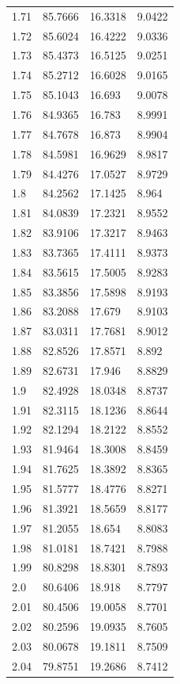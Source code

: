 \begin{tabular}{llll}
1.71 & 85.7666 & 16.3318 & 9.0422 \\
1.72 & 85.6024 & 16.4222 & 9.0336 \\
1.73 & 85.4373 & 16.5125 & 9.0251 \\
1.74 & 85.2712 & 16.6028 & 9.0165 \\
1.75 & 85.1043 & 16.693 & 9.0078 \\
1.76 & 84.9365 & 16.783 & 8.9991 \\
1.77 & 84.7678 & 16.873 & 8.9904 \\
1.78 & 84.5981 & 16.9629 & 8.9817 \\
1.79 & 84.4276 & 17.0527 & 8.9729 \\
1.8 & 84.2562 & 17.1425 & 8.964 \\
1.81 & 84.0839 & 17.2321 & 8.9552 \\
1.82 & 83.9106 & 17.3217 & 8.9463 \\
1.83 & 83.7365 & 17.4111 & 8.9373 \\
1.84 & 83.5615 & 17.5005 & 8.9283 \\
1.85 & 83.3856 & 17.5898 & 8.9193 \\
1.86 & 83.2088 & 17.679 & 8.9103 \\
1.87 & 83.0311 & 17.7681 & 8.9012 \\
1.88 & 82.8526 & 17.8571 & 8.892 \\
1.89 & 82.6731 & 17.946 & 8.8829 \\
1.9 & 82.4928 & 18.0348 & 8.8737 \\
1.91 & 82.3115 & 18.1236 & 8.8644 \\
1.92 & 82.1294 & 18.2122 & 8.8552 \\
1.93 & 81.9464 & 18.3008 & 8.8459 \\
1.94 & 81.7625 & 18.3892 & 8.8365 \\
1.95 & 81.5777 & 18.4776 & 8.8271 \\
1.96 & 81.3921 & 18.5659 & 8.8177 \\
1.97 & 81.2055 & 18.654 & 8.8083 \\
1.98 & 81.0181 & 18.7421 & 8.7988 \\
1.99 & 80.8298 & 18.8301 & 8.7893 \\
2.0 & 80.6406 & 18.918 & 8.7797 \\
2.01 & 80.4506 & 19.0058 & 8.7701 \\
2.02 & 80.2596 & 19.0935 & 8.7605 \\
2.03 & 80.0678 & 19.1811 & 8.7509 \\
2.04 & 79.8751 & 19.2686 & 8.7412 \\

\end{tabular}
